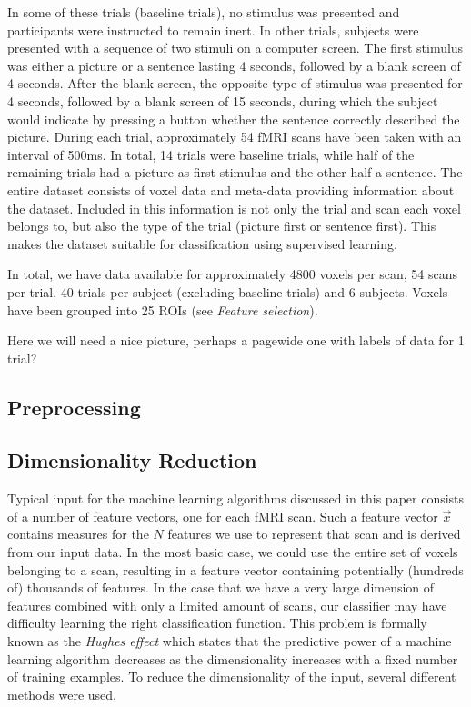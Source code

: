 \documentclass[preprint,journal,11pt]{vgtc}
\begin{document}
In some of these trials (baseline trials), no stimulus was presented and participants were instructed to remain inert. In other trials, subjects were presented with a sequence of two stimuli on a computer screen. The first stimulus was either a picture or a sentence lasting 4 seconds, followed by a blank screen of 4 seconds. After the blank screen, the opposite type of stimulus was presented for 4 seconds, followed by a blank screen of 15 seconds, during which the subject would indicate by pressing a button whether the sentence correctly described the picture. During each trial, approximately 54 fMRI scans have been taken with an interval of 500ms. In total, 14 trials were baseline trials, while half of the remaining trials had a picture as first stimulus and the other half a sentence.  
The entire dataset consists of voxel data and meta-data providing information about the dataset. Included in this information is not only the trial and scan each voxel belongs to, but also the type of the trial (picture first or sentence first). This makes the dataset suitable for classification using supervised learning.

In total, we have data available for approximately 4800 voxels per scan, 54 scans per trial, 40 trials per subject (excluding baseline trials) and 6 subjects. Voxels have been grouped into 25 ROIs (see \textit{Feature selection}).

Here we will need a nice picture, perhaps a pagewide one with labels of data for 1 trial?

\subsection{Preprocessing}

\subsection{Dimensionality Reduction}
\label{sec:dimensionalityReduction}
Typical input for the machine learning algorithms discussed in this paper consists of a number of feature vectors, one for each fMRI scan. Such a feature vector $\vec{x}$ contains measures for the $N$ features we use to represent that scan and is derived from our input data. In the most basic case, we could use the entire set of voxels belonging to a scan, resulting in a feature vector containing potentially (hundreds of) thousands of features.
In the case that we have a very large dimension of features combined with only a limited amount of scans, our classifier may have difficulty learning the right classification function. This problem is formally known as the \textit{Hughes effect}\cite{Hughes1054102} which states that the predictive power of a machine learning algorithm decreases as the dimensionality increases with a fixed number of training examples. To reduce the dimensionality of the input, several different methods were used.
\end{document}
